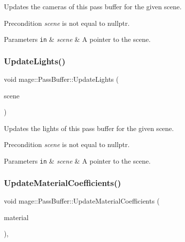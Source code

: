 Updates the cameras of this pass buffer for the given scene.

\begin{DoxyPrecond}{Precondition}
{\itshape scene} is not equal to {\ttfamily nullptr}. 
\end{DoxyPrecond}

\begin{DoxyParams}[1]{Parameters}
\mbox{\tt in}  & {\em scene} & A pointer to the scene. \\
\hline
\end{DoxyParams}
\hypertarget{structmage_1_1_pass_buffer_a91a779121ecb4c08605d3073c34674c9}{}\label{structmage_1_1_pass_buffer_a91a779121ecb4c08605d3073c34674c9} 
\subsubsection{\texorpdfstring{Update\+Lights()}{UpdateLights()}}
{\footnotesize\ttfamily void mage\+::\+Pass\+Buffer\+::\+Update\+Lights (\begin{DoxyParamCaption}\item[{const \hyperlink{classmage_1_1_scene}{Scene} $\ast$}]{scene }\end{DoxyParamCaption})\hspace{0.3cm}{\ttfamily [private]}}

Updates the lights of this pass buffer for the given scene.

\begin{DoxyPrecond}{Precondition}
{\itshape scene} is not equal to {\ttfamily nullptr}. 
\end{DoxyPrecond}

\begin{DoxyParams}[1]{Parameters}
\mbox{\tt in}  & {\em scene} & A pointer to the scene. \\
\hline
\end{DoxyParams}
\hypertarget{structmage_1_1_pass_buffer_a6857c2e1be91655c58f8d91d02d9c60b}{}\label{structmage_1_1_pass_buffer_a6857c2e1be91655c58f8d91d02d9c60b} 
\subsubsection{\texorpdfstring{Update\+Material\+Coefficients()}{UpdateMaterialCoefficients()}}
{\footnotesize\ttfamily void mage\+::\+Pass\+Buffer\+::\+Update\+Material\+Coefficients (\begin{DoxyParamCaption}\item[{const \hyperlink{structmage_1_1_material}{Material} $\ast$}]{material }\end{DoxyParamCaption})\hspace{0.3cm}{\ttfamily [private]}, {\ttfamily [noexcept]}}

